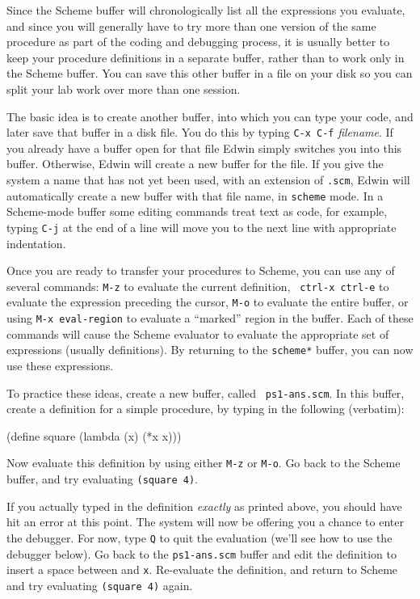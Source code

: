 Since the Scheme buffer will chronologically list all the expressions
you evaluate, and since you will generally have to try more than one
version of the same procedure as part of the coding and debugging
process, it is usually better to keep your procedure definitions in a
separate buffer, rather than to work only in the Scheme buffer.  You
can save this other buffer in a file on your disk so you can split
your lab work over more than one session.

The basic idea is to create another buffer, into which you can type your
code, and later save that buffer in a disk file.  You do this by
typing {\tt C-x C-f} {\it filename}.  If you already have a buffer
open for that file Edwin simply switches you into this buffer.
Otherwise, Edwin will create a new buffer for the file.  If you give
the system a name that has not yet been used, with an extension of
{\tt .scm}, Edwin will automatically create a new buffer with that
file name, in {\tt scheme} mode.  In a Scheme-mode buffer some editing
commands treat text as code, for example, typing {\tt C-j} at the end
of a line will move you to the next line with appropriate indentation.

Once you are ready to transfer your procedures to Scheme, you can use any
of several commands: {\tt M-z} to evaluate the current definition, {\tt
ctrl-x ctrl-e} to evaluate the expression preceding the cursor, {\tt M-o}
to evaluate the entire buffer, or using {\tt M-x eval-region} to evaluate
a ``marked'' region in the buffer.  Each of these commands will cause the
Scheme evaluator to evaluate the appropriate set of expressions (usually
definitions).  By returning to the {\tt *scheme*} buffer, you can now use
these expressions.

To practice these ideas, create a new buffer, called {\tt
ps1-ans.scm}.  In this buffer, create a definition for a simple
procedure, by typing in the following (verbatim):

\beginlisp
(define square (lambda (x) (*x x)))
\endlisp

\noindent
Now evaluate this definition by using either {\tt M-z} or {\tt M-o}.
Go back to the Scheme buffer, and try evaluating {\tt (square 4)}.

If you actually typed in the definition {\em exactly} as printed above,
you should have hit an error at this point.  The system will now be
offering you a chance to enter the debugger.  For now, type {\tt Q} to
quit the evaluation (we'll see how to use the debugger below).  Go back to
the {\tt ps1-ans.scm} buffer and edit the definition to insert a space
between {\tt *} and {\tt x}.  Re-evaluate the definition, and return to
Scheme and try evaluating {\tt (square 4)} again.

